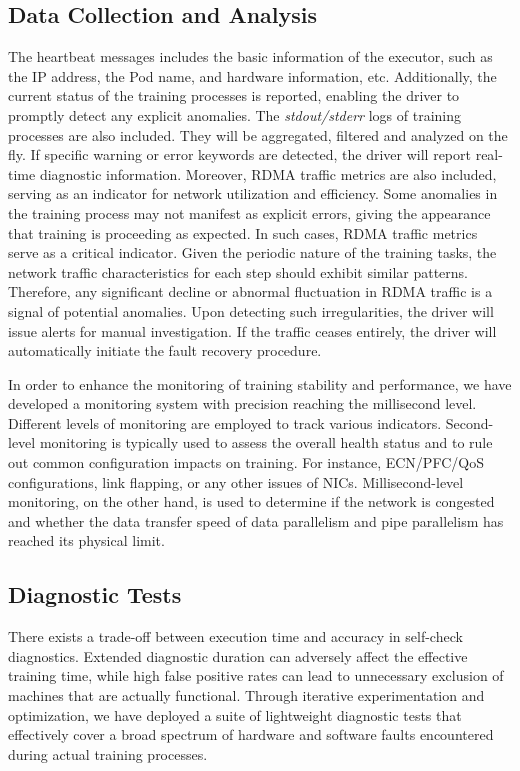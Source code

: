 \subsection{Data Collection and Analysis}
\label{sec:log}

The heartbeat messages includes the basic information of the executor, such as
the IP address, the Pod name, and hardware information, etc. Additionally, the
current status of the training processes is reported, enabling the driver to
promptly detect any explicit anomalies. The \textit{stdout/stderr} logs of
training processes are also included. They will be aggregated, filtered and
analyzed on the fly.
If specific warning or error keywords are detected, the driver
will report real-time diagnostic information. Moreover, RDMA traffic metrics
are also included, serving as an indicator for network utilization and efficiency.
Some anomalies in the training process may not manifest as explicit errors,
giving the appearance that training is proceeding as expected. In such cases,
RDMA traffic metrics serve as a critical indicator. Given the periodic nature of
the training tasks, the network traffic characteristics for each step should
exhibit similar patterns. Therefore, any significant decline or abnormal
fluctuation in RDMA traffic is a signal of potential anomalies. Upon detecting
such irregularities, the driver will issue alerts for manual investigation. If
the traffic ceases entirely, the driver will automatically initiate the fault
recovery procedure. 

In order to enhance the monitoring of training stability and performance, we have developed a monitoring system with precision reaching the millisecond level. Different levels of monitoring are employed to track various indicators. Second-level monitoring is typically used to assess the overall health status and to rule out common configuration impacts on training. For instance, ECN/PFC/QoS configurations, link flapping, or any other issues of NICs. Millisecond-level monitoring, on the other hand, is used to determine if the network is congested and whether the data transfer speed of data parallelism and pipe parallelism has reached its physical limit.



\subsection{Diagnostic Tests}
\label{sec:faults_checker}

There exists a trade-off between execution time and accuracy in self-check
diagnostics. Extended diagnostic duration can adversely affect the effective
training time, while high false positive rates can lead to unnecessary
exclusion of machines that are actually functional. Through iterative
experimentation and optimization, we have deployed a suite of lightweight
diagnostic tests that effectively cover a broad spectrum of hardware and
software faults encountered during actual training processes.


